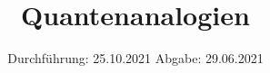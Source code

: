 
\setlength\parindent{0pt}
\subject{V23}
\title{Quantenanalogien}
\date{%
  Durchführung: 25.10.2021
  \hspace{3em}
  Abgabe: 29.06.2021 \\
}



\maketitle
\thispagestyle{empty}
\tableofcontents
\newpage







\newpage
\nocite{*}
\printbibliography


